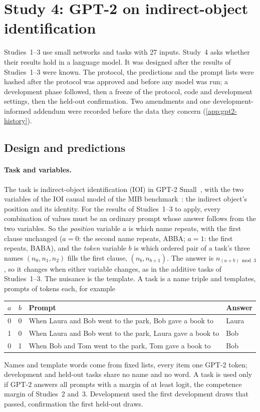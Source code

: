 \section{Study 4: GPT-2 on indirect-object identification}\label{sec:gpt2}

Studies~1--3 use small networks and tasks with 27 inputs. Study~4 asks whether their results hold in a language model.
It was designed after the results of Studies~1--3 were known. The protocol, the predictions and the prompt lists were
hashed after the protocol was approved and before any model was run; a development phase followed, then a freeze of
the protocol, code and development settings, then the held-out confirmation. Two amendments and one
development-informed addendum were recorded before the data they concern (\cref{app:gpt2-history}).

\subsection{Design and predictions}\label{sec:gpt2-design}

\paragraph{Task and variables.} The task is indirect-object identification (IOI) in GPT-2
Small~\citep{wang2023ioi}, with the two variables of the IOI causal model of the MIB benchmark~\citep{mueller2025mib}:
the indirect object's position and its identity. For the results of Studies~1--3 to apply, every combination of
values must be an ordinary prompt whose answer follows from the two variables. So the \emph{position} variable $a$ is
which name repeats, with the first clause unchanged ($a=0$: the second name repeats, ABBA; $a=1$: the first repeats,
BABA), and the \emph{token} variable $b$ is which ordered pair of a task's three names $(n_0,n_1,n_2)$ fills the first
clause, $(n_b,n_{b+1})$. The answer is $n_{(a+b)\bmod 3}$, so it changes when either variable changes, as in the
additive tasks of Studies~1--3. The nuisance is the template. A task is a name triple and \NTemplates{} templates,
\NPrompts{} prompts of \NTokens{} tokens each, for example
\begin{center}\small
\begin{tabular}{@{}ccll@{}}
\toprule
$a$ & $b$ & Prompt & Answer \\
\midrule
0 & 0 & When Laura and Bob went to the park, Bob gave a book to & Laura \\
1 & 0 & When Laura and Bob went to the park, Laura gave a book to & Bob \\
0 & 1 & When Bob and Tom went to the park, Tom gave a book to & Bob \\
\bottomrule
\end{tabular}
\end{center}
Names and template words come from fixed lists, every item one GPT-2 token; development and held-out tasks share no
name and no word. A task is used only if GPT-2 answers all \NPrompts{} prompts with a margin of at least
\CompetenceMargin{} logit, the competence margin of Studies~2 and~3. Development used the first \NTasksDev{}
development draws that passed, confirmation the first \NTasksConf{} held-out draws.

